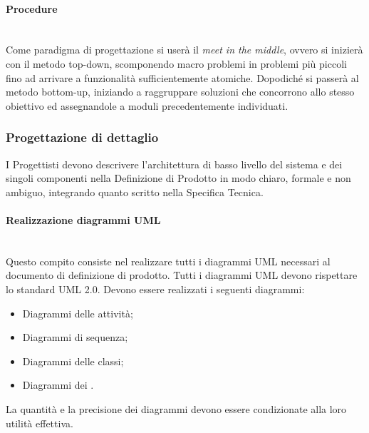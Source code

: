 \paragraph{Procedure} \hfill \\
Come paradigma di progettazione si userà il \textit{meet in the middle}, ovvero si inizierà con il metodo top-down, scomponendo macro problemi in problemi più piccoli fino ad arrivare a funzionalità sufficientemente atomiche.
Dopodiché si passerà al metodo bottom-up, iniziando a raggruppare soluzioni che concorrono allo stesso obiettivo ed assegnandole a moduli precedentemente individuati.


\subsubsection{Progettazione di dettaglio}
\label{prog_dettaglio}
I Progettisti devono descrivere l'architettura di basso livello del sistema e dei singoli componenti nella Definizione di Prodotto in modo chiaro, formale e non ambiguo, integrando quanto scritto nella Specifica Tecnica.

\paragraph{Realizzazione diagrammi UML} \hfill \\
Questo compito consiste nel realizzare tutti i diagrammi UML necessari al documento di definizione di prodotto.
Tutti i diagrammi UML devono rispettare lo standard UML 2.0.
Devono essere realizzati i seguenti diagrammi:
\begin{itemize}
\item Diagrammi delle attivit\`{a};
\item Diagrammi di sequenza;
\item Diagrammi delle classi;
\item Diagrammi dei .
\end{itemize}

La quantità e la precisione dei diagrammi devono essere condizionate alla loro utilità effettiva.

